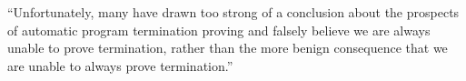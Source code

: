 \begin{frame}

\begin{center}

``Unfortunately, many have drawn too strong of a conclusion about the prospects
of automatic program termination proving and falsely believe we are always
unable to prove termination, rather than the more benign consequence that we
are unable to always prove termination.''

\end{center}

\begin{flushright}
\cite{cook2011}
\end{flushright}

\end{frame}
